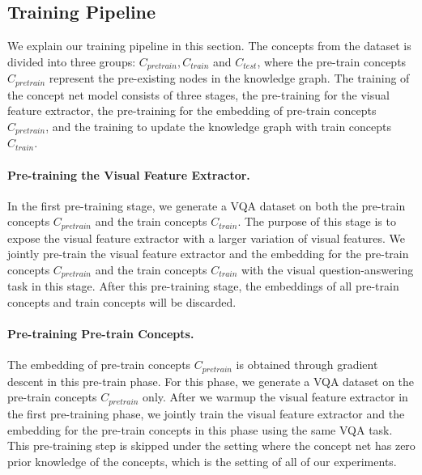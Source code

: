 
\subsection{Training Pipeline}
 We explain our training pipeline in this section. 
 The concepts from the dataset is divided into three groups: $C_{pretrain}, C_{train}$ and $C_{test}$, where the pre-train concepts $C_{pretrain}$ represent the pre-existing nodes in the knowledge graph. The training of the concept net model consists of three stages, the pre-training for the visual feature extractor, the pre-training for the embedding of pre-train concepts $C_{pretrain}$, and the training to update the knowledge graph with train concepts $C_{train}$. 
 \paragraph{Pre-training the Visual Feature Extractor.}
 In the first pre-training stage, we generate a VQA dataset on both the pre-train concepts $C_{pretrain}$ and the train concepts $C_{train}$. The purpose of this stage is to expose the visual feature extractor with a larger variation of visual features. 
 We jointly pre-train the visual feature extractor and the embedding for the pre-train concepts $C_{pretrain}$ and the train concepts $C_{train}$ with the visual question-answering task in this stage.
 After this pre-training stage, the embeddings of all pre-train concepts and train concepts will be discarded.
 \paragraph{Pre-training Pre-train Concepts.}
 The embedding of pre-train concepts $C_{pretrain}$ is obtained through gradient descent in this pre-train phase.
 For this phase, we generate a VQA dataset on the pre-train concepts $C_{pretrain}$ only.
 After we warmup the visual feature extractor in the first pre-training phase, we jointly train the visual feature extractor and the embedding for the pre-train concepts in this phase using the same VQA task.
 This pre-training step is skipped under the setting where the concept net has zero prior knowledge of the concepts, which is the setting of all of our experiments.
